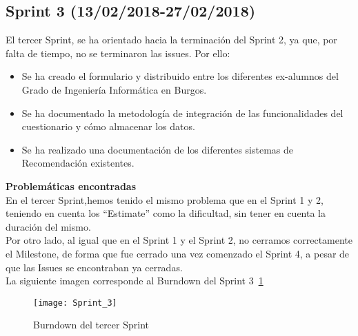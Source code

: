 \subsection{\textbf{Sprint 3}  (13/02/2018-27/02/2018) }
El tercer Sprint, se ha orientado hacia la terminación del Sprint 2, ya que, por falta de tiempo, no se terminaron las issues. 
Por ello: 
\begin{itemize}
\item Se ha creado el formulario y distribuido entre los diferentes ex-alumnos del Grado de Ingeniería Informática en Burgos. 
\item Se ha documentado la metodología de integración de las funcionalidades del cuestionario y cómo almacenar los datos. 
\item Se ha realizado una documentación de los diferentes sistemas de Recomendación existentes.  
\end{itemize}
\textbf{Problemáticas encontradas}\\En el tercer Sprint,hemos tenido el mismo problema que en el Sprint 1 y 2, teniendo en cuenta los ``Estimate'' como la dificultad, sin tener en cuenta la duración del mismo.\\Por otro lado, al igual que en el Sprint 1 y el Sprint 2, no cerramos correctamente el Milestone, de forma que fue cerrado una vez comenzado el Sprint 4, a pesar de que las Issues se encontraban ya cerradas. \\La siguiente imagen corresponde al Burndown del Sprint 3~\ref{fig:A.2.3}
\begin{figure}[h]
\centering
\texttt{[image: Sprint\_3]}
\caption{Burndown del tercer Sprint}
\label{fig:A.2.3}
\end{figure}
\\

